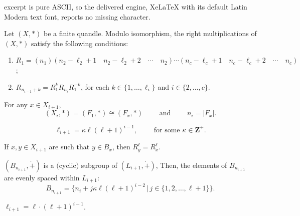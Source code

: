 \documentclass[10pt,a4paper]{amsart}
\begin{document}
excerpt is pure ASCII, so the delivered engine, XeLaTeX with its default Latin Modern text font, reports no missing character.
\begin{proposition}\label{prop:assertions}
Let $(X, *)$ be a finite quandle.
Modulo isomorphism, the right multiplications of $(X,*)$ satisfy the following conditions:
\begin{enumerate}
    \item $R_1=(n_1)(n_2-\ell_2+1\quad n_2-\ell_2+2\quad\cdots\quad n_2)\cdots(n_c-\ell_c+1\quad n_c-\ell_c+2\quad\cdots\quad n_c)$;
    \item $R_{n_{i-1}+k}=R_1^{k}R_{n_i}R_1^{-k}$, for each $k\in\{1,\dots,\ell_i\}$ and $i\in\{2,\dots,c\}$.
\end{enumerate}
\end{proposition}

\begin{lemma}\label{lem:Fxiso}
For any $x\in X_{i+1}$,
$$(X_i, *) = (F_1, *) \cong (F_x, *)\qquad \text{ and } \qquad n_i=|F_x| .$$
\end{lemma}

\begin{lemma}\label{lem:kappa}
$$\ell_{i+1}=\kappa \ell(\ell+1)^{i-1} ,\qquad \text{ for some $\kappa\in\mathbf{Z}^+$}.$$
\end{lemma}

\begin{proposition}\label{prop:asspowers}
If $x,y\in X_{i+1}$ are such that $y\in B_x$, then $R_y^\ell=R_x^\ell$.
\end{proposition}

\begin{corollary}\label{cor:Bni+1}
$(B_{n_{i+1}},  \dot{+})$ is a $($cyclic$)$ subgroup of $(L_{i+1}, \dot{+})$, Then, the elements of $B_{n_{i+1}}$ are evenly spaced within $L_{i+1}$: $$B_{n_{i+1}}=\{n_i+j\kappa \ell (\ell+1)^{i-2}\, |\, j\in\{ 1, 2, \dots, \ell+1\}\} .$$
\end{corollary}

\begin{lemma}\label{cor:final}
$\ell_{i+1}=\ell\cdot(\ell+1)^{i-1}$.
\end{lemma}
\end{document}
